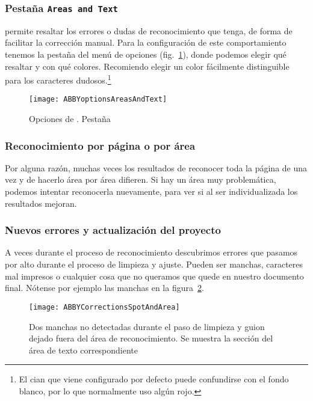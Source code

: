 \documentclass[%
	a5paper,
	10pt,
	twoside,
	openright,
	final,
]{memoir}
\begin{document}
	\subsubsection{Pestaña \texttt{Areas and Text}} \abby permite resaltar los errores o dudas de reconocimiento que tenga, de forma de facilitar la corrección manual. Para la configuración de este comportamiento tenemos la pestaña  del menú de opciones (fig.~\ref{fig:ABBYoptionsAreasAndText}), donde podemos elegir qué resaltar y con qué colores. Recomiendo elegir un color fácilmente distinguible para los caracteres dudosos.\footnote{El cian que viene configurado por defecto puede confundirse con el fondo blanco, por lo que normalmente uso algún rojo.}

	\begin{figure}
		\texttt{[image: ABBYoptionsAreasAndText]}
		\caption[Opciones de \abby. Pestaña Areas and Text]{Opciones de \abby. Pestaña \label{fig:ABBYoptionsAreasAndText}}
	\end{figure}

	\subsubsection{Reconocimiento por página o por área} Por alguna razón, muchas veces los resultados de reconocer toda la página de una vez y de hacerlo área por área difieren. Si hay un área muy problemática, podemos intentar reconocerla nuevamente, para ver si al ser individualizada los resultados mejoran.

	\subsubsection{Nuevos errores y actualización del proyecto\label{sec:ABBYCorrectionsSpotAndArea}} A veces durante el proceso de reconocimiento descubrimos errores que pasamos por alto durante el proceso de limpieza y ajuste. Pueden ser manchas, caracteres mal impresos o cualquier cosa que no queramos que quede en nuestro documento final. Nótense por ejemplo las manchas en la figura~\ref{fig:ABBYCorrectionsSpotAndArea}.

	\begin{figure}
		\texttt{[image: ABBYCorrectionsSpotAndArea]}
		\caption[Dos manchas no detectadas durante el paso de limpieza y guion dejado fuera del área de reconocimiento]{Dos manchas no detectadas durante el paso de limpieza y guion dejado fuera del área de reconocimiento. Se muestra la sección del área de texto correspondiente\label{fig:ABBYCorrectionsSpotAndArea}}
	\end{figure}
\end{document}
